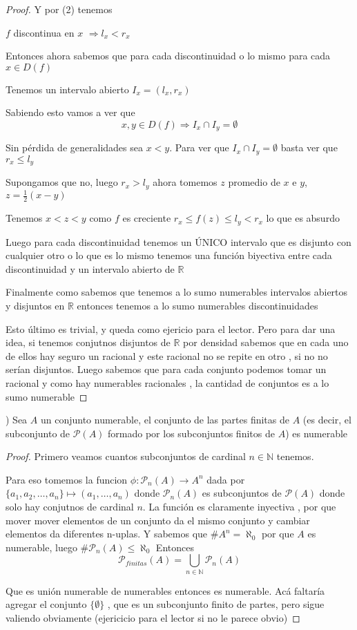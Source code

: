 \documentclass[12pt]{article}
\newcommand{\n}{\aleph_{0}}
\newcommand{\R}{\mathbb{R}}
\newcommand{\N}{\mathbb{N}}
\newcommand{\Ra}{\Rightarrow}
\newcommand{\ra}{\rightarrow}
\theoremstyle{definition}
\begin{document}
\begin{proof}
  Y por (2) tenemos \begin{center} $f$ discontinua en $x$ $\Ra l_{x} < r_{x}$ \end{center}

  Entonces ahora sabemos que para cada discontinuidad o lo mismo para cada $x \in D(f)$

  Tenemos un intervalo abierto $I_{x} = (l_{x},r_{x})$

  Sabiendo esto vamos a ver que $$x ,y \in D(f) \Ra I_{x} \cap I_{y} = \emptyset $$

  Sin pérdida de generalidades sea $x < y$. Para ver que $I_{x} \cap I_{y} = \emptyset$ basta ver que $r_{x} \leq l_{y}$

  Supongamos que no, luego $r_{x} > l_{y}$ ahora tomemos $z$ promedio de $x$ e $y$, $z = \frac{1}{2} (x - y)$

  Tenemos $x < z < y$ como $f$ es creciente $r_{x} \leq f(z) \leq l_{y} < r_{x}$ lo que es absurdo

  Luego para cada discontinuidad tenemos un ÚNICO intervalo que es disjunto con cualquier otro  o lo que es lo mismo tenemos una función biyectiva entre cada discontinuidad y un intervalo abierto de $\R$

  Finalmente como sabemos que tenemos a lo sumo numerables intervalos abiertos y disjuntos en $\R$ entonces tenemos a lo sumo numerables discontinuidades 
  
  Esto último es trivial, y queda como ejericio para el lector. Pero para dar una idea, si tenemos conjutnos disjuntos de $\R$ por densidad sabemos que en cada uno de ellos hay seguro un racional y este racional no se repite en otro , si no no serían disjuntos. Luego sabemos que para cada conjunto podemos tomar un racional y como hay numerables racionales , la cantidad de conjuntos es a lo sumo numerable 
\end{proof}

) Sea $A$ un conjunto numerable, el conjunto de las partes finitas de $A$ (es decir, el subconjunto de $\mathcal{P}(A)$ formado por los subconjuntos finitos de $A$) es numerable

\begin{proof}
  Primero veamos cuantos subconjuntos de cardinal $n \in \N$ tenemos.

  Para eso tomemos la funcion $ \phi :  \mathcal{P}_{n}(A) \ra A^n$ dada por $\{a_{1}, a_{2} ,\dots , a_{n}\} \mapsto  (a_{1}, \dots , a_{n}) $ donde $\mathcal{P}_{n}(A)$ es subconjuntos de $\mathcal{P}(A)$ donde solo hay conjutnos de cardinal $n$. La función es claramente inyectiva , por que mover mover elementos de un conjunto da el mismo conjunto y cambiar elementos da diferentes n-uplas. Y sabemos que $\# A^{n} = \n$ por que $A$ es numerable, luego $\# \mathcal{P}_{n}(A) \leq \n$
  Entonces $$ \mathcal{P}_{finitas}(A) = \bigcup_{n \in \N} \mathcal{P}_{n}(A)$$

  Que es unión numerable de numerables entonces es numerable. Acá faltaría agregar el conjunto $\{\emptyset\}$ , que es un subconjunto finito de partes, pero sigue valiendo obviamente (ejericicio para el lector si no le parece obvio)
\end{proof}
\end{document}
